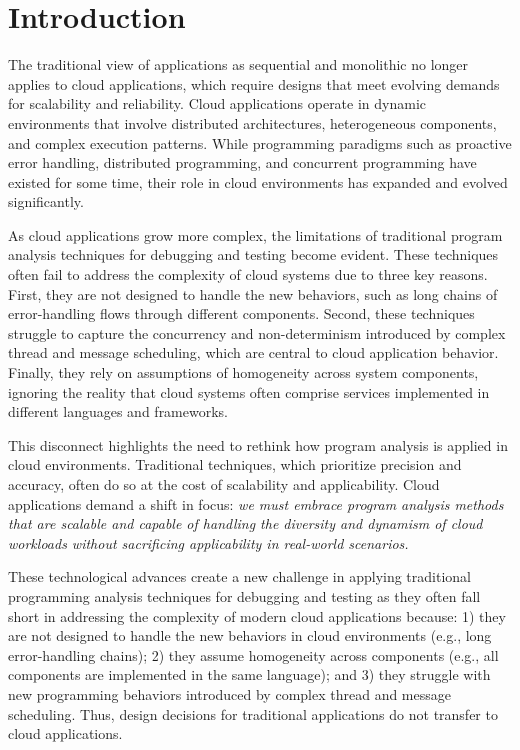 \chapter{Introduction}

The traditional view of applications as sequential and monolithic no longer applies to cloud applications, which require designs that meet evolving demands for scalability and reliability. Cloud applications operate in dynamic environments that involve distributed architectures, heterogeneous components, and complex execution patterns. While programming paradigms such as proactive error handling, distributed programming, and concurrent programming have existed for some time, their role in cloud environments has expanded and evolved significantly.


As cloud applications grow more complex, the limitations of traditional program analysis techniques for debugging and testing become evident. These techniques often fail to address the complexity of cloud systems due to three key reasons. First, they are not designed to handle the new behaviors, such as long chains of error-handling flows through different components. Second, these techniques struggle to capture the concurrency and non-determinism introduced by complex thread and message scheduling, which are central to cloud application behavior. Finally, they rely on assumptions of homogeneity across system components, ignoring the reality that cloud systems often comprise services implemented in different languages and frameworks. 


This disconnect highlights the need to rethink how program analysis is applied in cloud environments. Traditional techniques, which prioritize precision and accuracy, often do so at the cost of scalability and applicability. Cloud applications demand a shift in focus: \emph{we must embrace program analysis methods that are scalable and capable of handling the diversity and dynamism of cloud workloads without sacrificing applicability in real-world scenarios.}

These technological advances create a new challenge in applying traditional programming analysis techniques for debugging and testing as they often fall short in addressing the complexity of modern cloud applications because: 1) they are not designed to handle the new behaviors in cloud environments (e.g., long error-handling chains); 2) they assume homogeneity across components (e.g., all components are implemented in the same language); and 3) they struggle with new programming behaviors introduced by complex thread and message scheduling. Thus, design decisions for traditional applications do not transfer to cloud applications.

